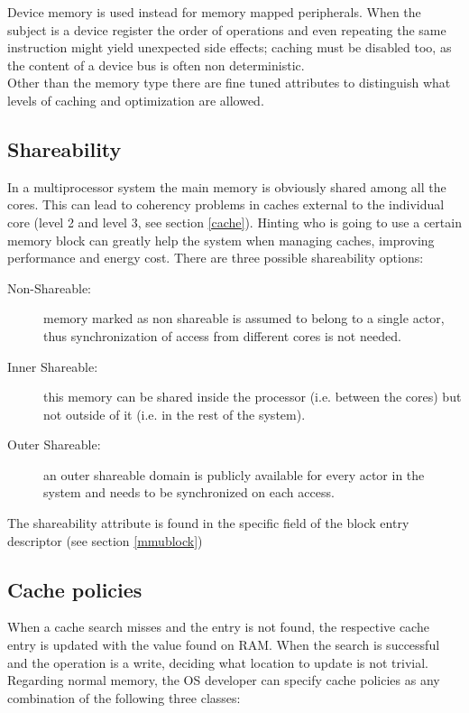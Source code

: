 \documentclass[12pt,a4paper,openright,twoside]{report}
\begin{document}
Device memory is used instead for memory mapped peripherals. When the subject is
a device register the order of operations and even repeating the same instruction
might yield unexpected side effects; caching must be disabled too, as the content
of a device bus is often non deterministic.\\
Other than the memory type there are fine tuned attributes to distinguish
what levels of caching and optimization are allowed.

\subsection{Shareability}
In a multiprocessor system the main memory is obviously shared among all the cores.
This can lead to coherency problems in caches external to the individual core (level 2
and level 3, see section \ref{cache}). Hinting who is going to use a certain memory
block can greatly help the system when managing caches, improving performance
and energy cost. There are three possible
shareability options:
\begin{description}
    \item[Non-Shareable:] memory marked as non shareable is assumed to belong to
        a single actor, thus synchronization of access from different cores is 
        not needed.
    \item[Inner Shareable:] this memory can be shared inside the processor (i.e. 
        between the cores) but not outside of it (i.e. in the rest of the system).
    \item[Outer Shareable:] an outer shareable domain is publicly available for 
        every actor in the system and needs to be synchronized on each access.
\end{description}
The shareability attribute is found in the specific field of the block entry descriptor
(see section \ref{mmublock})

\newpage

\subsection{Cache policies}
When a cache search misses and the entry is not found, the respective cache entry is 
updated with the value found on RAM. When the search is successful and the
operation is a write, deciding what location to update is not trivial. \\
Regarding normal memory, the OS developer can specify cache policies as any combination
of the following three classes:
\end{document}
